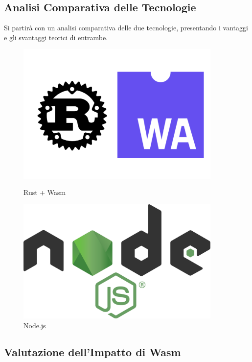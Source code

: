 \subsection{Analisi Comparativa delle Tecnologie}
Si partirà con un analisi comparativa delle due tecnologie, presentando i vantaggi e gli svantaggi teorici di entrambe.
\begin{figure}
        \centering
        \begin{minipage}{0.40\textwidth}
            \centering
            \includegraphics[width=0.9\textwidth]{images/rustwasm.jpg} %
            \caption{Rust + Wasm}
        \end{minipage}\hfill
        \begin{minipage}{0.40\textwidth}
            \centering
            \includegraphics[width=0.9\textwidth]{images/node.png} %
            \caption{Node.js}
        \end{minipage}
    \end{figure}
\subsection{Valutazione dell'Impatto di Wasm}




